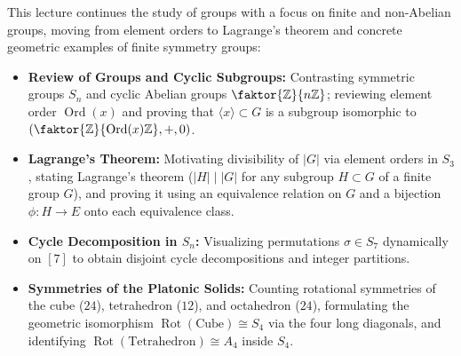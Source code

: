 


\begin{overview}
This lecture continues the study of groups with a focus on finite and non-Abelian groups, moving from element orders to Lagrange's theorem and concrete geometric examples of finite symmetry groups:
\begin{itemize}
    \item \textbf{Review of Groups and Cyclic Subgroups:} Contrasting symmetric groups $S_n$ and cyclic Abelian groups $\faktor{\mathbb{Z}}{n\mathbb{Z}}$; reviewing element order $\operatorname{Ord}(x)$ and proving that $\langle x \rangle \subset G$ is a subgroup isomorphic to $(\faktor{\mathbb{Z}}{\operatorname{Ord}(x)\mathbb{Z}}, +, 0)$.
    \item \textbf{Lagrange's Theorem:} Motivating divisibility of $|G|$ via element orders in $S_3$, stating Lagrange's theorem ($|H| \mid |G|$ for any subgroup $H \subset G$ of a finite group $G$), and proving it using an equivalence relation on $G$ and a bijection $\phi \colon H \to E$ onto each equivalence class.
    \item \textbf{Cycle Decomposition in $S_n$:} Visualizing permutations $\sigma \in S_7$ dynamically on $[7]$ to obtain disjoint cycle decompositions and integer partitions.
    \item \textbf{Symmetries of the Platonic Solids:} Counting rotational symmetries of the cube ($24$), tetrahedron ($12$), and octahedron ($24$), formulating the geometric isomorphism $\operatorname{Rot}(\text{Cube}) \cong S_4$ via the four long diagonals, and identifying $\operatorname{Rot}(\text{Tetrahedron}) \cong A_4$ inside $S_4$.
\end{itemize}
\end{overview}

